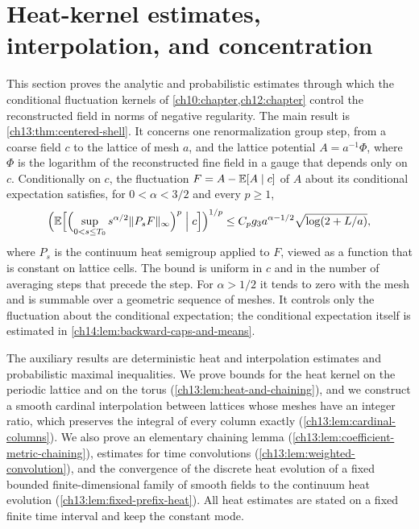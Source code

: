\chapter{Heat-kernel estimates, interpolation, and concentration}\label{ch13:chapter}

This section proves the analytic and probabilistic estimates through which the conditional fluctuation kernels of \cref{ch10:chapter,ch12:chapter} control the reconstructed field in norms of negative regularity. The main result is \cref{ch13:thm:centered-shell}. It concerns one renormalization group step, from a coarse field $c$ to the lattice of mesh $a$, and the lattice potential $A=a^{-1}\Phi$, where $\Phi$ is the logarithm of the reconstructed fine field in a gauge that depends only on $c$. Conditionally on $c$, the fluctuation $F=A-\mathbb E[A\mid c]$ of $A$ about its conditional expectation satisfies, for $0<\alpha<3/2$ and every $p\ge1$,
\[
 \Bigl(\mathbb E\Bigl[\Bigl(\sup_{0<s\le T_0}s^{\alpha/2}\lVert P_sF\rVert_\infty\Bigr)^p\Bigm|c\Bigr]\Bigr)^{1/p}
 \le C_pg_3a^{\alpha-1/2}\sqrt{\log(2+L/a)},
\]
where $P_s$ is the continuum heat semigroup applied to $F$, viewed as a function that is constant on lattice cells. The bound is uniform in $c$ and in the number of averaging steps that precede the step. For $\alpha>1/2$ it tends to zero with the mesh and is summable over a geometric sequence of meshes. It controls only the fluctuation about the conditional expectation; the conditional expectation itself is estimated in \cref{ch14:lem:backward-caps-and-means}.

The auxiliary results are deterministic heat and interpolation estimates and probabilistic maximal inequalities. We prove bounds for the heat kernel on the periodic lattice and on the torus (\cref{ch13:lem:heat-and-chaining}), and we construct a smooth cardinal interpolation between lattices whose meshes have an integer ratio, which preserves the integral of every column exactly (\cref{ch13:lem:cardinal-columns}). We also prove an elementary chaining lemma (\cref{ch13:lem:coefficient-metric-chaining}), estimates for time convolutions (\cref{ch13:lem:weighted-convolution}), and the convergence of the discrete heat evolution of a fixed bounded finite-dimensional family of smooth fields to the continuum heat evolution (\cref{ch13:lem:fixed-prefix-heat}). All heat estimates are stated on a fixed finite time interval and keep the constant mode.

